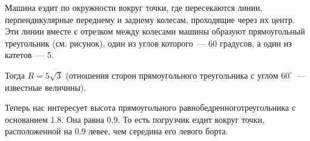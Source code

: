 ﻿
\begin{itemize}

\itA Машина ездит по окружности вокруг точки, где пересекаются линии, перпендикулярные переднему и заднему колесам, проходящие через их центр. Эти линии вместе с отрезком между колесами машины образуют прямоугольный треугольник (см. рисунок), один из углов которого~— 60 градусов, а один из катетов~— \SI{5}{}.

Тогда $R = 5 \sqrt{3}$ (отношения сторон прямоугольного треугольника с углом $60^\circ$~— известные величины).

\begin{center}
\end{center}

\itB Теперь нас интересует высота прямоугольного равнобедренного\linebreak треугольника с основанием \SI{1.8}{}. Она равна \SI{0.9}{}. То есть погрузчик ездит вокруг точки, расположенной на \SI{0.9}{} левее, чем середина его левого борта.


\end{itemize}
